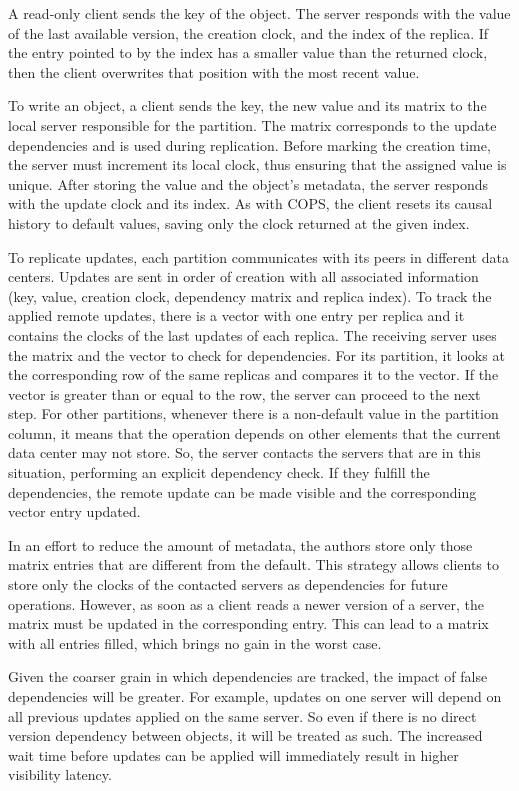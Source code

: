 A read-only client sends the key of the object. 
The server responds with the value of the last available version, 
the creation clock, 
and the index of the replica. 
If the entry pointed to by the index has a smaller value than the returned 
clock, 
then the client overwrites that position with the most recent value. 

To write an object, a client sends the key, 
the new value and its matrix to the local server responsible for the partition. 
The matrix corresponds to the update dependencies and is used during 
replication. 
Before marking the creation time, 
the server must increment its local clock, 
thus ensuring that the assigned value is unique. 
After storing the value and the object's metadata, 
the server responds with the update clock and its index. 
As with COPS, the client resets its causal history to default values, 
saving only the clock returned at the given index. 

To replicate updates, 
each partition communicates with its peers in different data centers. 
Updates are sent in order of creation with all associated information 
(key, value, creation clock, dependency matrix and replica index). 
To track the applied remote updates, 
there is a vector with one entry per replica and it contains the clocks of the 
last updates of each replica. 
The receiving server uses the matrix and the vector to check for dependencies. 
For its partition, 
it looks at the corresponding row of the same replicas and compares it to the 
vector. 
If the vector is greater than or equal to the row, 
the server can proceed to the next step. 
For other partitions, 
whenever there is a non-default value in the partition column, 
it means that the operation depends on other elements that the current data 
center may not store. 
So, the server contacts the servers that are in this situation, 
performing an explicit dependency check. 
If they fulfill the dependencies, 
the remote update can be made visible and the corresponding vector entry 
updated. 

In an effort to reduce the amount of metadata, 
the authors store only those matrix entries that are different from the default.
This strategy allows clients to store only the clocks of the contacted servers 
as dependencies for future operations. 
However, as soon as a client reads a newer version of a server, 
the matrix must be updated in the corresponding entry. 
This can lead to a matrix with all entries filled, 
which brings no gain in the worst case. 

Given the coarser grain in which dependencies are tracked, 
the impact of false dependencies will be greater. 
For example, updates on one server will depend on all previous updates applied 
on the same server. 
So even if there is no direct version dependency between objects, 
it will be treated as such. 
The increased wait time before updates can be applied will immediately result 
in higher visibility latency. 

